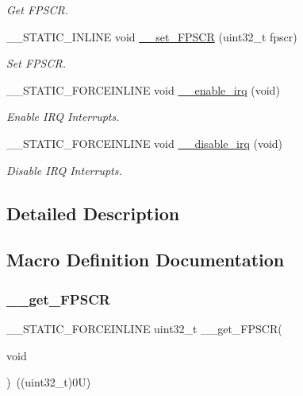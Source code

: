 \begin{DoxyCompactItemize}
\begin{DoxyCompactList}\small\item\em Get F\+P\+S\+CR. \end{DoxyCompactList}\item 
\+\_\+\+\_\+\+S\+T\+A\+T\+I\+C\+\_\+\+I\+N\+L\+I\+NE void \mbox{\hyperlink{group___c_m_s_i_s___core___reg_acc_functions_ga63aa6f7ed41dcaf39cbccb11e812ad4e}{\+\_\+\+\_\+set\+\_\+\+F\+P\+S\+CR}} (uint32\+\_\+t fpscr)
\begin{DoxyCompactList}\small\item\em Set F\+P\+S\+CR. \end{DoxyCompactList}\item 
\+\_\+\+\_\+\+S\+T\+A\+T\+I\+C\+\_\+\+F\+O\+R\+C\+E\+I\+N\+L\+I\+NE void \mbox{\hyperlink{group___c_m_s_i_s___core___reg_acc_functions_gae84bf4e95944e61937f4ed2453e5ef23}{\+\_\+\+\_\+enable\+\_\+irq}} (void)
\begin{DoxyCompactList}\small\item\em Enable I\+RQ Interrupts. \end{DoxyCompactList}\item 
\+\_\+\+\_\+\+S\+T\+A\+T\+I\+C\+\_\+\+F\+O\+R\+C\+E\+I\+N\+L\+I\+NE void \mbox{\hyperlink{group___c_m_s_i_s___core___reg_acc_functions_ga2299877e4ba3e162ca9dbabd6e0abef6}{\+\_\+\+\_\+disable\+\_\+irq}} (void)
\begin{DoxyCompactList}\small\item\em Disable I\+RQ Interrupts. \end{DoxyCompactList}\end{DoxyCompactItemize}


\subsection{Detailed Description}


\subsection{Macro Definition Documentation}
\mbox{\label{group___c_m_s_i_s___core___reg_acc_functions_ga4d0739b1355ca5642a7ce76df1271f01}} 
\subsubsection{\texorpdfstring{\_\_get\_FPSCR}{\_\_get\_FPSCR}}
{\footnotesize\ttfamily \+\_\+\+\_\+\+S\+T\+A\+T\+I\+C\+\_\+\+F\+O\+R\+C\+E\+I\+N\+L\+I\+NE uint32\+\_\+t \+\_\+\+\_\+get\+\_\+\+F\+P\+S\+CR(\begin{DoxyParamCaption}\item[{}]{void }\end{DoxyParamCaption})~((uint32\+\_\+t)0\+U)}



